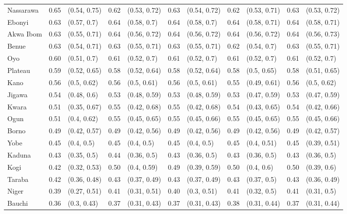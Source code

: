 \begin{tabular}{lrlrlrlrlrl}
Nassarawa & 0.65 & (0.54, 0.75) & 0.62 & (0.53, 0.72) & 0.63 & (0.54, 0.72) & 0.62 & (0.53, 0.71) & 0.63 & (0.53, 0.72)\\
Ebonyi & 0.63 & (0.57, 0.7) & 0.64 & (0.58, 0.7) & 0.64 & (0.58, 0.7) & 0.64 & (0.58, 0.71) & 0.64 & (0.58, 0.71)\\
Akwa Ibom & 0.63 & (0.55, 0.71) & 0.64 & (0.56, 0.72) & 0.64 & (0.56, 0.72) & 0.64 & (0.56, 0.72) & 0.64 & (0.56, 0.73)\\
Benue & 0.63 & (0.54, 0.71) & 0.63 & (0.55, 0.71) & 0.63 & (0.55, 0.71) & 0.62 & (0.54, 0.7) & 0.63 & (0.55, 0.71)\\
Oyo & 0.60 & (0.51, 0.7) & 0.61 & (0.52, 0.7) & 0.61 & (0.52, 0.7) & 0.61 & (0.52, 0.7) & 0.61 & (0.52, 0.7)\\
Plateau & 0.59 & (0.52, 0.65) & 0.58 & (0.52, 0.64) & 0.58 & (0.52, 0.64) & 0.58 & (0.5, 0.65) & 0.58 & (0.51, 0.65)\\
Kano & 0.56 & (0.5, 0.62) & 0.56 & (0.5, 0.61) & 0.56 & (0.5, 0.61) & 0.55 & (0.49, 0.61) & 0.56 & (0.5, 0.62)\\
Jigawa & 0.54 & (0.48, 0.6) & 0.53 & (0.48, 0.59) & 0.53 & (0.48, 0.59) & 0.53 & (0.47, 0.59) & 0.53 & (0.47, 0.59)\\
Kwara & 0.51 & (0.35, 0.67) & 0.55 & (0.42, 0.68) & 0.55 & (0.42, 0.68) & 0.54 & (0.43, 0.65) & 0.54 & (0.42, 0.66)\\
Ogun & 0.51 & (0.4, 0.62) & 0.55 & (0.45, 0.65) & 0.55 & (0.45, 0.66) & 0.55 & (0.45, 0.65) & 0.55 & (0.45, 0.66)\\
Borno & 0.49 & (0.42, 0.57) & 0.49 & (0.42, 0.56) & 0.49 & (0.42, 0.56) & 0.49 & (0.42, 0.56) & 0.49 & (0.42, 0.57)\\
Yobe & 0.45 & (0.4, 0.5) & 0.45 & (0.4, 0.5) & 0.45 & (0.4, 0.5) & 0.45 & (0.4, 0.51) & 0.45 & (0.39, 0.51)\\
Kaduna & 0.43 & (0.35, 0.5) & 0.44 & (0.36, 0.5) & 0.43 & (0.36, 0.5) & 0.43 & (0.36, 0.5) & 0.43 & (0.36, 0.5)\\
Kogi & 0.42 & (0.32, 0.53) & 0.50 & (0.4, 0.59) & 0.49 & (0.39, 0.59) & 0.50 & (0.4, 0.6) & 0.50 & (0.39, 0.6)\\
Taraba & 0.42 & (0.36, 0.48) & 0.43 & (0.37, 0.49) & 0.43 & (0.37, 0.49) & 0.43 & (0.37, 0.5) & 0.43 & (0.36, 0.49)\\
Niger & 0.39 & (0.27, 0.51) & 0.41 & (0.31, 0.51) & 0.40 & (0.3, 0.51) & 0.41 & (0.32, 0.5) & 0.41 & (0.31, 0.5)\\
Bauchi & 0.36 & (0.3, 0.43) & 0.37 & (0.31, 0.43) & 0.37 & (0.31, 0.43) & 0.38 & (0.31, 0.44) & 0.37 & (0.31, 0.44)\\

\end{tabular}
